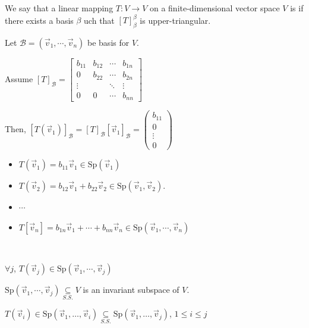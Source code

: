 \documentclass[11pt,fleqn]{book} %
\begin{document}
\setcounter{chapter}{6}
\setcounter{dummy}{3}
\begin{proposition}[Triangularizable]
    We say that a linear mapping $T: V \to V$ on a finite-dimensional vector space $V$ is  if there exists a basis $\beta$ uch that $[T]_\beta^\beta$ is upper-triangular.
\end{proposition}
\setcounter{chapter}{4}

Let $\mathcal{B} = (\vec{v}_1, \cdots, \vec{v}_n)$ be basis for $V$.

Assume $[T]_\mathcal{B} =\begin{bmatrix} b_{11} &b_{12} & \cdots &b_{1n} \\ 0 &b_{22} &\cdots &b_{2n} \\ \vdots & &\ddots &\vdots \\ 0 &0 &\cdots &b_{nn} \end{bmatrix}$

Then, $[T(\vec{v}_1)]_\mathcal{B} = [T]_\mathcal{B}[\vec{v}_1]_\mathcal{B} = \begin{pmatrix} b_{11} \\ 0 \\\vdots \\ 0 \end{pmatrix}$

\begin{itemize}
    \item $T(\vec{v}_1) = b_{11}\vec{v}_1 \in \mathrm{Sp}(\vec{v}_1)$
    \item $T(\vec{v}_2) = b_{12}\vec{v}_1 + b_{22}\vec{v}_2 \in \mathrm{Sp}(\vec{v}_1, \vec{v}_2)$.
    \item $\cdots$
    \item $T[\vec{v}_n] = b_{1n}\vec{v}_1 + \cdots + b_{nn}\vec{v}_n \in \mathrm{Sp}(\vec{v}_1, \cdots, \vec{v}_n)$
\end{itemize}

{~~~}

$\forall j$, $T(\vec{v}_j) \in \mathrm{Sp}(\vec{v}_1, \cdots, \vec{v}_j)$

$\mathrm{Sp}(\vec{v}_1, \cdots, \vec{v}_j) \underset{S.S.}{\subseteq} V$ is an invariant subspace of $V$.

$T(\vec{v}_i) \in \mathrm{Sp}(\vec{v}_1, \dots, \vec{v}_i) \underset{S.S.}{\subseteq} \mathrm{Sp}(\vec{v}_1, \dots, \vec{v}_j)$, $1 \le i \le j$
\end{document}
